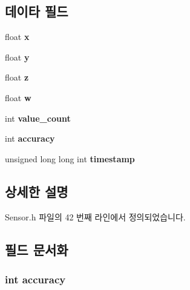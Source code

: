 \subsection*{데이타 필드}
\begin{DoxyCompactItemize}
\item 
\hypertarget{struct__4d__data_ad0da36b2558901e21e7a30f6c227a45e}{float {\bfseries x}}\label{struct__4d__data_ad0da36b2558901e21e7a30f6c227a45e}

\item 
\hypertarget{struct__4d__data_aa4f0d3eebc3c443f9be81bf48561a217}{float {\bfseries y}}\label{struct__4d__data_aa4f0d3eebc3c443f9be81bf48561a217}

\item 
\hypertarget{struct__4d__data_af73583b1e980b0aa03f9884812e9fd4d}{float {\bfseries z}}\label{struct__4d__data_af73583b1e980b0aa03f9884812e9fd4d}

\item 
\hypertarget{struct__4d__data_a56eca241e2896b9f57a79589e76fd24b}{float {\bfseries w}}\label{struct__4d__data_a56eca241e2896b9f57a79589e76fd24b}

\item 
\hypertarget{struct__4d__data_a40a079bfc72408819dc78da308203a74}{int {\bfseries value\-\_\-count}}\label{struct__4d__data_a40a079bfc72408819dc78da308203a74}

\item 
\hypertarget{struct__4d__data_a5565cf9073275f9713f9016e7c10d25f}{int {\bfseries accuracy}}\label{struct__4d__data_a5565cf9073275f9713f9016e7c10d25f}

\item 
\hypertarget{struct__4d__data_a8de02c4128636a7bf630ff5428f60c8d}{unsigned long long int {\bfseries timestamp}}\label{struct__4d__data_a8de02c4128636a7bf630ff5428f60c8d}

\end{DoxyCompactItemize}


\subsection{상세한 설명}


Sensor.\-h 파일의 42 번째 라인에서 정의되었습니다.



\subsection{필드 문서화}
\hypertarget{struct__4d__data_a5565cf9073275f9713f9016e7c10d25f}{
\subsubsection[{accuracy}]{\setlength{\rightskip}{0pt plus 5cm}int accuracy}}\label{struct__4d__data_a5565cf9073275f9713f9016e7c10d25f}


